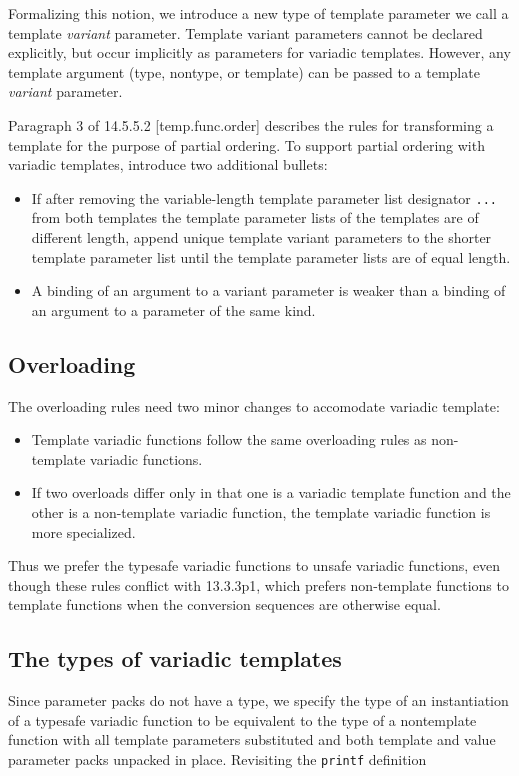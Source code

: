 \documentclass{article}
\begin{document}
Formalizing this notion, we introduce a new type of template
parameter we call a template {\em variant} parameter. Template variant
parameters cannot be declared explicitly, but occur implicitly as
parameters for variadic templates. However, any template argument
(type, nontype, or template) can be passed to a template {\em variant}
parameter. 

Paragraph 3 of 14.5.5.2 [temp.func.order] describes the rules for
transforming a template for the purpose of partial ordering. To
support partial ordering with variadic templates, introduce two
additional bullets:
\begin{itemize}
\item If after removing the variable-length template parameter list
  designator \verb|...| from both templates the template parameter lists of the
  templates are of different length, append unique template variant
  parameters to the shorter template parameter list until the template
  parameter lists are of equal length.
\item A binding of an argument to a variant parameter is weaker than a
  binding of an argument to a parameter of the same kind.
\end{itemize}

\subsection{Overloading}
\label{overloading}
The overloading rules need two minor changes to accomodate variadic template:
\begin{itemize}
\item Template variadic functions follow the same overloading rules as
  non-template variadic functions.
\item If two overloads differ only in that one is a variadic template
  function and the other is a non-template variadic function, the
  template variadic function is more specialized.
\end{itemize}

Thus we prefer the typesafe variadic functions to unsafe variadic
functions, even though these rules conflict with 13.3.3p1, which
prefers non-template functions to template functions when the
conversion sequences are otherwise equal.

\subsection{The types of variadic templates}
Since parameter packs do not have a type, we specify the
type of an instantiation of a typesafe variadic function to be equivalent
to the type of a nontemplate function with all template parameters
substituted and both template and value parameter packs unpacked
in place. Revisiting the {\tt printf} definition
\end{document}
